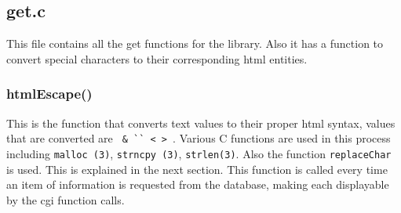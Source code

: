 \documentclass{article}
\begin{document}
\subsection{get.c}
This file contains all the get functions for the library. Also it has a function to convert special characters to their corresponding html entities.

\subsubsection*{htmlEscape()}
This is the function that converts text values to their proper html syntax, values that are converted are \verb| & `` < > |. Various C functions are used in this process including \verb|malloc (3)|, \verb|strncpy (3)|, \verb|strlen(3)|. Also the function \verb|replaceChar| is used. This is explained in the next section. This function is called every time an item of information is requested from the database, making each displayable by the cgi function calls.

\end{document}
